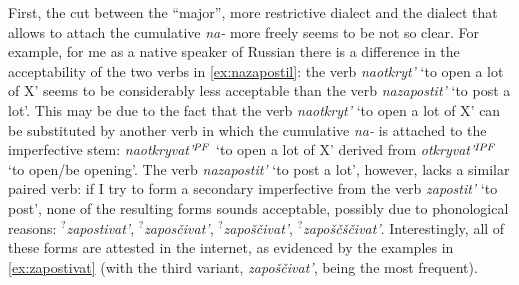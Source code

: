 First, the cut between the ``major'', more restrictive dialect and the dialect that allows to attach the cumulative \textit{na-} more freely seems to be not so clear. For example, for me as a native speaker of Russian there is a difference in the acceptability of the two verbs in \ref{ex:nazapostil}: the verb \textit{naotkryt'} `to open a lot of X' seems to be considerably less acceptable than the verb \textit{nazapostit'} `to post a lot'. This may be due to the fact that the verb \textit{naotkryt'} `to open a lot of X' can be substituted by another verb in which the cumulative \textit{na-} is attached to the imperfective stem: \textit{naotkryvat'}$^{\mathit{PF}}$ `to open a lot of X' derived from \textit{otkryvat'}$^{\mathit{IPF}}$ `to open/be opening'. The verb \textit{nazapostit'} `to post a lot', however, lacks a similar paired verb: if I try to form a secondary imperfective from the verb \textit{zapostit'} `to post', none of the resulting forms sounds acceptable, possibly due to phonological reasons: $^?$\textit{zapostivat'}, $^?$\textit{zapos\v{c}ivat'}, $^?$\textit{zapo\v{s}\v{c}ivat'}, $^?$\textit{zapo\v{s}\v{c}\v{s}\v{c}ivat'}. Interestingly, all of these forms are attested in the internet, as evidenced by the examples in \ref{ex:zapostivat} (with the third variant, \textit{zapo\v{s}\v{c}ivat'}, being the most frequent).

